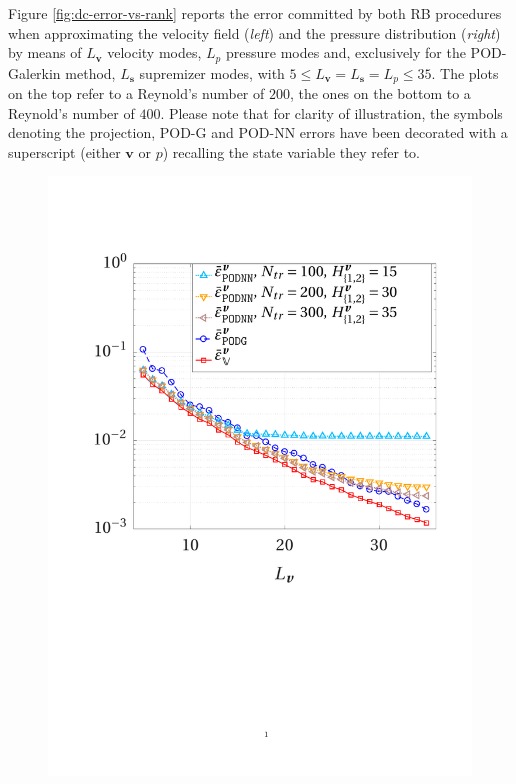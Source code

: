 \documentclass{elsarticle}
\numberwithin{equation}{section}
\theoremstyle{theorem}
\theoremstyle{definition}
\theoremstyle{remark}
\theoremstyle{proposition}
\numberwithin{figure}{section}
\newcommand{\bg}[1]{\boldsymbol{#1}}
\begin{document}
		Figure \ref{fig:dc-error-vs-rank} reports the error committed by both RB procedures when approximating the velocity field (\emph{left}) and the pressure distribution (\emph{right}) by means of $L_{\bg{v}}$ velocity modes, $L_p$ pressure modes and, exclusively for the POD-Galerkin method, $L_{\bg{s}}$ supremizer modes, with $5 \leq L_{\bg{v}} = L_{\bg{s}} = L_p \leq 35$. The plots on the top refer to a Reynold's number of $200$, the ones on the bottom to a Reynold's number of $400$. Please note that for clarity of illustration, the symbols denoting the projection, POD-G and POD-NN errors have been decorated with a superscript (either $\bg{v}$ or $p$) recalling the state variable they refer to. 
		\begin{figure}[t!]
			\center
			\includegraphics[scale = 0.38, trim = {2cm 9cm 1.5cm 3.5cm}, clip]{dc_200_vel_error_vs_rank_ter}
			\hspace*{1cm}

\end{figure}
\end{document}
